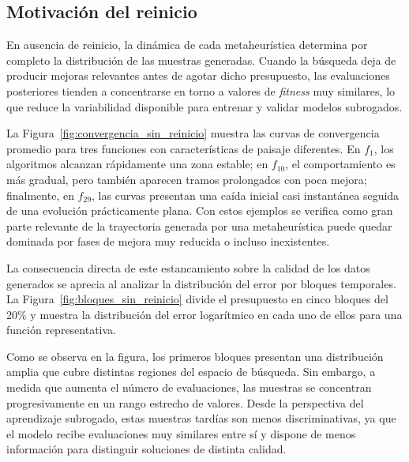 \subsection{Motivación del reinicio}
\label{subsec:motivacion_reinicio}


En ausencia de reinicio, la dinámica de cada metaheurística determina por completo la distribución de las muestras generadas. Cuando la búsqueda deja de producir mejoras relevantes antes de agotar dicho presupuesto, las evaluaciones posteriores tienden a concentrarse en torno a valores de \textit{fitness} muy similares, lo que reduce la variabilidad disponible para entrenar y validar modelos subrogados.

La Figura~\ref{fig:convergencia_sin_reinicio} muestra las curvas de convergencia promedio para tres funciones con características de paisaje diferentes. En \(f_1\), los algoritmos alcanzan rápidamente una zona estable; en \(f_{10}\), el comportamiento es más gradual, pero también aparecen tramos prolongados con poca mejora; finalmente, en \(f_{29}\), las curvas presentan una caída inicial casi instantánea seguida de una evolución prácticamente plana. Con estos ejemplos se verifica como gran parte relevante de la trayectoria generada por una metaheurística puede quedar dominada por fases de mejora muy reducida o incluso inexistentes.

La consecuencia directa de este estancamiento sobre la calidad de los datos generados se aprecia al analizar la distribución del error por bloques temporales. La Figura~\ref{fig:bloques_sin_reinicio} divide el presupuesto en cinco bloques del 20\% y muestra la distribución del error logarítmico en cada uno de ellos para una función representativa.

Como se observa en la figura, los primeros bloques presentan una distribución amplia que cubre distintas regiones del espacio de búsqueda. Sin embargo, a medida que aumenta el número de evaluaciones, las muestras se concentran progresivamente en un rango estrecho de valores. Desde la perspectiva del aprendizaje subrogado, estas muestras tardías son menos discriminativas, ya que el modelo recibe evaluaciones muy similares entre sí y dispone de menos información para distinguir soluciones de distinta calidad.

